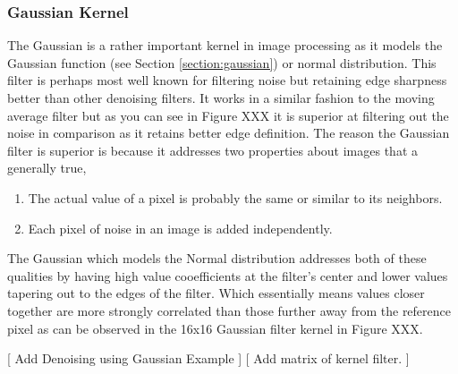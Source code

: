 \subsubsection{Gaussian Kernel}

The Gaussian is a rather important kernel in image processing as it models the Gaussian function (see Section \ref{section:gaussian}) or normal distribution. This filter is perhaps most well known for filtering noise but retaining edge sharpness better than other denoising filters. It works in a similar fashion to the moving average filter but as you can see in Figure XXX it is superior at filtering out the noise in comparison as it retains better edge definition. The reason the Gaussian filter is superior is because it addresses two properties about images that a generally true, 
\begin{enumerate}
    \item The actual value of a pixel is probably the same or similar to its neighbors. 
    \item Each pixel of noise in an image is added independently.
\end{enumerate}

The Gaussian which models the Normal distribution addresses both of these qualities by having high value cooefficients at the filter's center and lower values tapering out to the edges of the filter. Which essentially means values closer together are more strongly correlated than those further away from the reference pixel as can be observed in the 16x16 Gaussian filter kernel in Figure XXX.

[ Add Denoising using Gaussian Example ]
[ Add matrix of kernel filter. ]